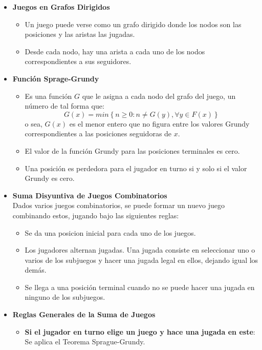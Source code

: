 \begin{itemize}
    \item{
		\textbf{Juegos en Grafos Dirigidos}
		\begin{itemize}
			\item{
				Un juego puede verse como un grafo dirigido donde los nodos son las posiciones y las aristas las jugadas.
			}
			\item{
				Desde cada nodo, hay una arista a cada uno de los nodos correspondientes a sus seguidores.			
			}
		\end{itemize}
    }
    \item{
		\textbf{Funci\'on Sprage-Grundy}
		\begin{itemize}
			\item{
				Es una funci\'on $G$ que le asigna a cada nodo del grafo del juego, un n\'umero de tal forma que:
				$$ G(x) = min \left\{ n \geq 0 \colon n \neq G(y), \forall y \in F(x)  \right\} $$
				o sea, $G(x)$ es el menor entero que no figura entre los valores Grundy correspondientes a las 
				posiciones seguidoras de $x$.
			}
			\item{
				El valor de la funci\'on Grundy para las posiciones terminales es cero.
			}
			\item{
				Una posici\'on es perdedora para el jugador en turno si y solo si el valor Grundy es cero.
			}
		\end{itemize}
    }
    \item{
		\textbf{Suma Disyuntiva de Juegos Combinatorios}\\
				Dados varios juegos combinatorios, se puede formar un nuevo juego combinando estos, jugando 
				bajo las siguientes reglas:
		\begin{itemize}
			\item{
				Se da una posicion inicial para cada uno de los juegos.
			}
			\item{
				Los jugadores alternan jugadas. Una jugada consiste en seleccionar uno o varios de los subjuegos y 
				hacer una jugada legal en ellos, dejando igual los dem\'as. 
			}
			\item{
				Se llega a una posici\'on terminal cuando no se puede hacer una jugada en ninguno de los subjuegos.  
			}
		\end{itemize}
    }
    \item{
		\textbf{Reglas Generales de la Suma de Juegos}
		\begin{itemize}
			\item{
				\textbf{Si el jugador en turno elige un juego y hace una jugada en este}: Se aplica el Teorema Sprague-Grundy.
}
\end{itemize}}
\end{itemize}
